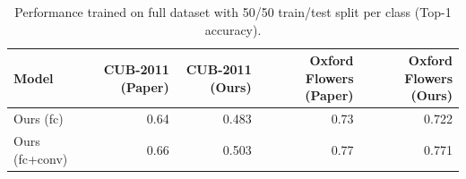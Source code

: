 
\begin{table}[t]
\centering
\scriptsize
\caption{Performance trained on full dataset with 50/50 train/test split per class (Top-1 accuracy).}
\label{tab:table4}
\begin{tabular}{lrrrr}
\toprule
Model & CUB-2011 (Paper) & CUB-2011 (Ours) & Oxford Flowers (Paper) & Oxford Flowers (Ours) \\ \midrule
Ours (fc) & 0.64 & 0.483 & 0.73 & 0.722 \\
Ours (fc+conv) & 0.66 & 0.503 & 0.77 & 0.771 \\
 \bottomrule
\end{tabular}
\end{table}

